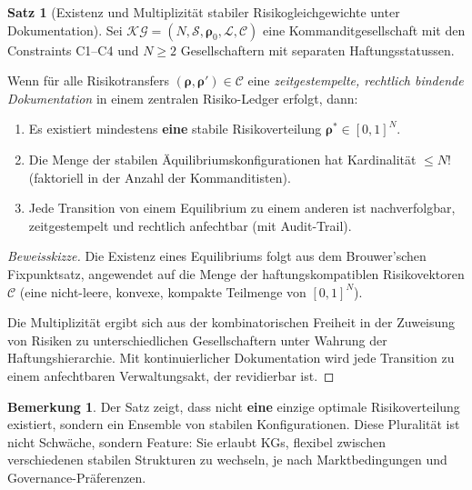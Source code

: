 \documentclass[a4paper,12pt]{article}
\theoremstyle{definition}
\newtheorem{satz}{Satz}
\newtheorem{bemerkung}{Bemerkung}
\begin{document}
\begin{satz}[Existenz und Multiplizität stabiler Risikogleichgewichte unter Dokumentation]
\label{satz:risikoequilibrium}
Sei $\mathcal{KG} = (N, \mathcal{S}, \boldsymbol{\rho}_0, \mathcal{L}, \mathcal{C})$ eine Kommanditgesellschaft mit den Constraints C1--C4 und $N \geq 2$ Gesellschaftern mit separaten Haftungsstatussen. 

Wenn für alle Risikotransfers $({\boldsymbol{\rho}}, {\boldsymbol{\rho}}') \in \mathcal{C}$ eine \emph{zeitgestempelte, rechtlich bindende Dokumentation} in einem zentralen Risiko-Ledger erfolgt, dann:

\begin{enumerate}
    \item Es existiert mindestens \textbf{eine} stabile Risikoverteilung $\boldsymbol{\rho}^* \in [0,1]^N$.
    
    \item Die Menge der stabilen Äquilibriumskonfigurationen hat Kardinalität $\leq N!$ (faktoriell in der Anzahl der Kommanditisten).
    
    \item Jede Transition von einem Equilibrium zu einem anderen ist nachverfolgbar, zeitgestempelt und rechtlich anfechtbar (mit Audit-Trail).
\end{enumerate}
\end{satz}

\begin{proof}[Beweisskizze]
Die Existenz eines Equilibriums folgt aus dem Brouwer'schen Fixpunktsatz, angewendet auf die Menge der haftungskompatiblen Risikovektoren $\mathcal{C}$ (eine nicht-leere, konvexe, kompakte Teilmenge von $[0,1]^N$). 

Die Multiplizität ergibt sich aus der kombinatorischen Freiheit in der Zuweisung von Risiken zu unterschiedlichen Gesellschaftern unter Wahrung der Haftungshierarchie. Mit kontinuierlicher Dokumentation wird jede Transition zu einem anfechtbaren Verwaltungsakt, der revidierbar ist.
\end{proof}

\begin{bemerkung}
Der Satz zeigt, dass nicht \textbf{eine} einzige optimale Risikoverteilung existiert, sondern ein Ensemble von stabilen Konfigurationen. Diese Pluralität ist nicht Schwäche, sondern Feature: Sie erlaubt KGs, flexibel zwischen verschiedenen stabilen Strukturen zu wechseln, je nach Marktbedingungen und Governance-Präferenzen.
\end{bemerkung}
\end{document}
